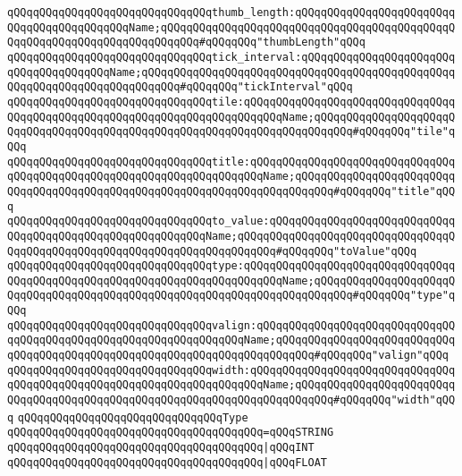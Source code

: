 \verb|qQQqqQQqqQQqqQQqqQQqqQQqqQQqqQQqthumb_length:qQQqqQQqqQQqqQQqqQQqqQQqqQQqqQQqqQQqqQQqqQQqName;qQQqqQQqqQQqqQQqqQQqqQQqqQQqqQQqqQQqqQQqqQQqqQQqqQQqqQQqqQQqqQQqqQQqqQQqqQQq#qQQqqQQq"thumbLength"qQQq|\newline
\verb|qQQqqQQqqQQqqQQqqQQqqQQqqQQqqQQqtick_interval:qQQqqQQqqQQqqQQqqQQqqQQqqQQqqQQqqQQqqQQqName;qQQqqQQqqQQqqQQqqQQqqQQqqQQqqQQqqQQqqQQqqQQqqQQqqQQqqQQqqQQqqQQqqQQqqQQqqQQq#qQQqqQQq"tickInterval"qQQq|\newline
\newline
\verb|qQQqqQQqqQQqqQQqqQQqqQQqqQQqqQQqtile:qQQqqQQqqQQqqQQqqQQqqQQqqQQqqQQqqQQqqQQqqQQqqQQqqQQqqQQqqQQqqQQqqQQqqQQqqQQqName;qQQqqQQqqQQqqQQqqQQqqQQqqQQqqQQqqQQqqQQqqQQqqQQqqQQqqQQqqQQqqQQqqQQqqQQqqQQq#qQQqqQQq"tile"qQQq|\newline
\verb|qQQqqQQqqQQqqQQqqQQqqQQqqQQqqQQqtitle:qQQqqQQqqQQqqQQqqQQqqQQqqQQqqQQqqQQqqQQqqQQqqQQqqQQqqQQqqQQqqQQqqQQqqQQqName;qQQqqQQqqQQqqQQqqQQqqQQqqQQqqQQqqQQqqQQqqQQqqQQqqQQqqQQqqQQqqQQqqQQqqQQqqQQq#qQQqqQQq"title"qQQq|\newline
\verb|qQQqqQQqqQQqqQQqqQQqqQQqqQQqqQQqto_value:qQQqqQQqqQQqqQQqqQQqqQQqqQQqqQQqqQQqqQQqqQQqqQQqqQQqqQQqqQQqName;qQQqqQQqqQQqqQQqqQQqqQQqqQQqqQQqqQQqqQQqqQQqqQQqqQQqqQQqqQQqqQQqqQQqqQQqqQQq#qQQqqQQq"toValue"qQQq|\newline
\verb|qQQqqQQqqQQqqQQqqQQqqQQqqQQqqQQqtype:qQQqqQQqqQQqqQQqqQQqqQQqqQQqqQQqqQQqqQQqqQQqqQQqqQQqqQQqqQQqqQQqqQQqqQQqqQQqName;qQQqqQQqqQQqqQQqqQQqqQQqqQQqqQQqqQQqqQQqqQQqqQQqqQQqqQQqqQQqqQQqqQQqqQQqqQQq#qQQqqQQq"type"qQQq|\newline
\newline
\verb|qQQqqQQqqQQqqQQqqQQqqQQqqQQqqQQqvalign:qQQqqQQqqQQqqQQqqQQqqQQqqQQqqQQqqQQqqQQqqQQqqQQqqQQqqQQqqQQqqQQqqQQqName;qQQqqQQqqQQqqQQqqQQqqQQqqQQqqQQqqQQqqQQqqQQqqQQqqQQqqQQqqQQqqQQqqQQqqQQqqQQq#qQQqqQQq"valign"qQQq|\newline
\verb|qQQqqQQqqQQqqQQqqQQqqQQqqQQqqQQqwidth:qQQqqQQqqQQqqQQqqQQqqQQqqQQqqQQqqQQqqQQqqQQqqQQqqQQqqQQqqQQqqQQqqQQqqQQqName;qQQqqQQqqQQqqQQqqQQqqQQqqQQqqQQqqQQqqQQqqQQqqQQqqQQqqQQqqQQqqQQqqQQqqQQqqQQq#qQQqqQQq"width"qQQq|\newline
\newline
\verb|qQQqqQQqqQQqqQQqqQQqqQQqqQQqqQQqType|\newline
\verb|qQQqqQQqqQQqqQQqqQQqqQQqqQQqqQQqqQQqqQQq=qQQqSTRING|\newline
\verb|qQQqqQQqqQQqqQQqqQQqqQQqqQQqqQQqqQQqqQQq|\verb#|qQQqINT#\newline
\verb|qQQqqQQqqQQqqQQqqQQqqQQqqQQqqQQqqQQqqQQq|\verb#|qQQqFLOAT#\newline
